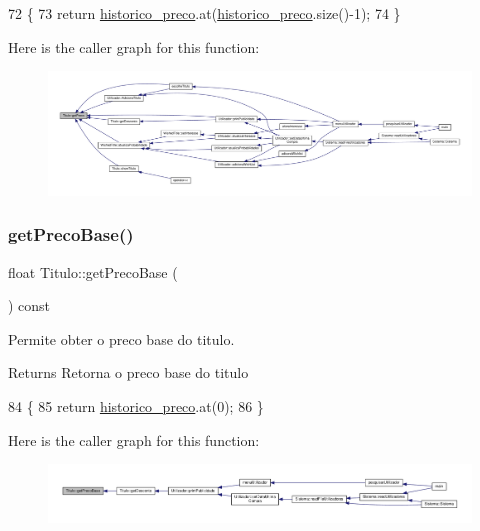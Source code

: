 \begin{DoxyCode}
72                               \{
73     \textcolor{keywordflow}{return} \hyperlink{classTitulo_aad5a44ca7e83939e8b47f1e11b80eca2}{historico\_preco}.at(\hyperlink{classTitulo_aad5a44ca7e83939e8b47f1e11b80eca2}{historico\_preco}.size()-1);
74   \}
\end{DoxyCode}
Here is the caller graph for this function\+:
\nopagebreak
\begin{figure}[H]
\begin{center}
\leavevmode
\includegraphics[width=350pt]{classTitulo_a93725bdc2e98350e47b54fd76c0fa236_icgraph}
\end{center}
\end{figure}
\mbox{\label{classTitulo_a5257cbaf35ad018001a7e48678795305}} 
\subsubsection{\texorpdfstring{get\+Preco\+Base()}{getPrecoBase()}}
{\footnotesize\ttfamily float Titulo\+::get\+Preco\+Base (\begin{DoxyParamCaption}{ }\end{DoxyParamCaption}) const}



Permite obter o preco base do titulo. 

\begin{DoxyReturn}{Returns}
Retorna o preco base do titulo 
\end{DoxyReturn}

\begin{DoxyCode}
84                                  \{
85      \textcolor{keywordflow}{return} \hyperlink{classTitulo_aad5a44ca7e83939e8b47f1e11b80eca2}{historico\_preco}.at(0);
86  \}
\end{DoxyCode}
Here is the caller graph for this function\+:
\nopagebreak
\begin{figure}[H]
\begin{center}
\leavevmode
\includegraphics[width=350pt]{classTitulo_a5257cbaf35ad018001a7e48678795305_icgraph}
\end{center}
\end{figure}
\mbox{\label{classTitulo_ae38bebc95efb3405d5cd9ca71aa98ab2}} 
